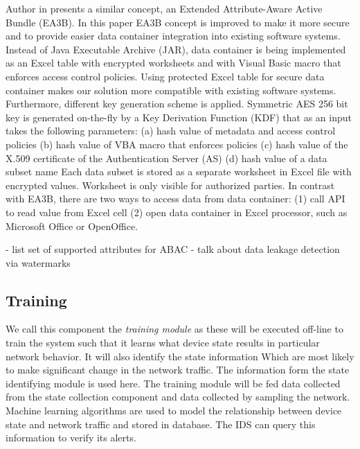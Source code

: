 \documentclass[conference]{IEEEtran}
\begin{document}
Author in \cite{c6} presents a similar concept, an Extended Attribute-Aware Active Bundle (EA3B). In this paper EA3B concept is improved to make it more secure and to provide easier data container integration into existing software systems. Instead of Java Executable Archive (JAR), data container is being implemented as an Excel table with encrypted worksheets and with Visual Basic macro that enforces access control policies. Using protected Excel table for secure data container makes our solution more compatible with existing software systems. Furthermore, different key generation scheme is applied. Symmetric AES 256 bit key is generated on-the-fly by a Key Derivation Function (KDF) that as an input takes the following parameters: 
(a) hash value of metadata and access control policies 
(b) hash value of VBA macro that enforces policies 
(c) hash value of the X.509 certificate of the Authentication Server (AS)
(d) hash value of a data subset name
Each data subset is stored as a separate worksheet in Excel file with encrypted values. Worksheet is only visible for authorized parties. In contrast with EA3B, there are two ways to access data from data container: 
(1) call API to read value from Excel cell 
(2) open data container in Excel processor, such as Microsoft Office or OpenOffice. 

- list set of supported attributes for ABAC
- talk about data leakage detection via watermarks


\subsection{Training}
We call this component the {\em training module} as these will be executed off-line to train the system such that it learns what device state results in particular network behavior. It will also identify the state information Which are most likely to make significant change in the network traffic. The information form the state identifying module is used here. The training module will be fed data collected from the state collection component and data collected by sampling the network. Machine learning algorithms are used to model the relationship between device state and network traffic and stored in  database. The IDS can query this information to verify its alerts.

 
\end{document}
